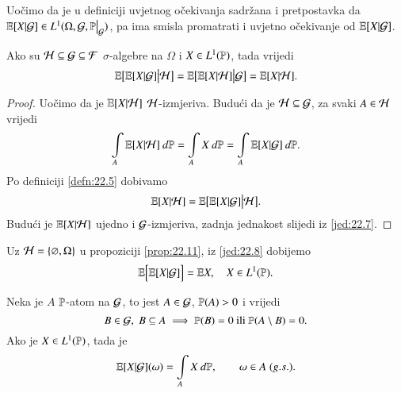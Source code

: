 Uo\v cimo da je u definiciji uvjetnog o\v cekivanja sadr\v zana i pretpostavka da $\masE [X | \famG] \in L^1 (\Omega, \famG, \restr{\masP}{\famG})$, pa ima smisla promatrati i uvjetno o\v cekivanje od $\mathbb{E} [X | \mathcal{G}]$.

\begin{prop}    \label{prop:22.11}
    Ako su $\mathcal{H} \subseteq \mathcal{G} \subseteq \mathcal{F}$ $\sigma$-algebre na $\Omega$ i $X \in L^1 (\mathbb{P})$, tada vrijedi
    \begin{equation*}
        \mathbb{E} \big[ \mathbb{E} [X | \mathcal{G}] \big| \mathcal{H} \big] = \mathbb{E} \big[ \mathbb{E} [X | \mathcal{H}] \big| \mathcal{G} \big] = \mathbb{E} [X | \mathcal{H}].
    \end{equation*}
\end{prop}

\begin{proof}
    Uo\v cimo da je $\mathbb{E} [X | \mathcal{H}]$ $\mathcal{H}$-izmjeriva.
    Budu\' ci da je $\mathcal{H} \subseteq \mathcal{G}$, za svaki $A \in \mathcal{H}$ vrijedi
    \begin{equation*}
        \int\limits_A \mathbb{E} [X | \mathcal{H}] \: d \mathbb{P} = \int\limits_A X \: d \mathbb{P} = \int\limits_A \mathbb{E} [X | \mathcal{G}] \: d \mathbb{P}.
    \end{equation*}
    Po definiciji \ref{defn:22.5} dobivamo
    \begin{equation*}
        \mathbb{E} [X | \mathcal{H}] = \mathbb{E} \big[ \mathbb{E} [X | \mathcal{G}] \big| \mathcal{H} \big].
    \end{equation*}
    Budu\' ci je $\mathbb{E} [X | \mathcal{H}]$ ujedno i $\mathcal{G}$-izmjeriva, zadnja jednakost slijedi iz \eqref{jed:22.7}.
\end{proof}

Uz $\mathcal{H} = \{ \varnothing, \Omega\}$ u propoziciji \ref{prop:22.11}, iz \eqref{jed:22.8} dobijemo
\begin{equation}    \label{jedn:22.12}
    \mathbb{E} \Big[ \mathbb{E} [X | \mathcal{G}] \Big] = \mathbb{E} X, \quad X \in L^1 (\mathbb{P}).
\end{equation}

\begin{zad} \label{zad:22.13}
    Neka je $A$ $\mathbb{P}$-atom na $\mathcal{G}$, to jest $A \in \mathcal{G}$, $\mathbb{P} (A) > 0$ i vrijedi
    \begin{equation*}
        B \in \mathcal{G}, \; B \subseteq A \implies \mathbb{P} (B) = 0 \textnormal{ ili } \mathbb{P} (A \setminus B) = 0.
    \end{equation*}
    Ako je $X \in L^1 (\mathbb{P})$, tada je
    \begin{equation*}
        \mathbb{E} [X | \mathcal{G}] (\omega) = \int\limits_A X \: d \mathbb{P}, \quad \quad \omega \in A \; (g.s.).
    \end{equation*}
\end{zad}

